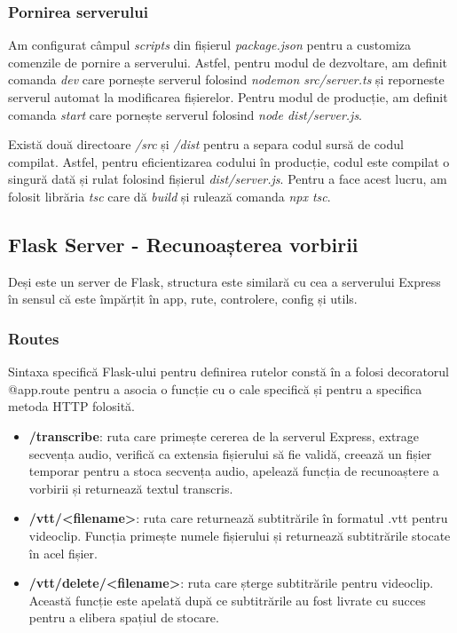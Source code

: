 \subsubsection{Pornirea serverului}
Am configurat câmpul \textit{scripts} din fișierul \textit{package.json} pentru a customiza
comenzile de pornire a serverului. Astfel, pentru modul de dezvoltare, am definit comanda
\textit{dev} care pornește serverul folosind \textit{nodemon src/server.ts} și reporneste serverul
automat la modificarea fișierelor. Pentru modul de producție, am definit comanda \textit{start}
care pornește serverul folosind \textit{node dist/server.js}.
\par
Există două directoare \textit{/src} și \textit{/dist} pentru a separa codul sursă de codul compilat.
Astfel, pentru eficientizarea codului în producție, codul este compilat o singură dată și rulat
folosind fișierul \textit{dist/server.js}. Pentru a face acest lucru, am folosit librăria \textit{tsc}
care dă \textit{build} și rulează comanda \textit{npx tsc}.


\subsection{Flask Server - Recunoașterea vorbirii}
Deși este un server de Flask, structura este similară cu cea a serverului Express în sensul
că este împărțit în app, rute, controlere, config și utils.

\subsubsection{Routes}

Sintaxa specifică Flask-ului pentru definirea rutelor constă în a folosi decoratorul @app.route
pentru a asocia o funcție cu o cale specifică și pentru a specifica metoda HTTP folosită.

\begin{itemize}
    \item \textbf{/transcribe}: ruta care primește cererea de la serverul Express, extrage secvența
    audio, verifică ca extensia fișierului să fie validă, creează un fișier temporar pentru a stoca
    secvența audio, apelează funcția de recunoaștere a vorbirii și returnează textul transcris.
    \item \textbf{/vtt/<filename>}: ruta care returnează subtitrările în formatul .vtt pentru videoclip.
    Funcția primește numele fișierului și returnează subtitrările stocate în acel fișier.
    \item \textbf{/vtt/delete/<filename>}: ruta care șterge subtitrările pentru videoclip. Această 
    funcție este apelată după ce subtitrările au fost livrate cu succes pentru a elibera spațiul de stocare.
\end{itemize}

